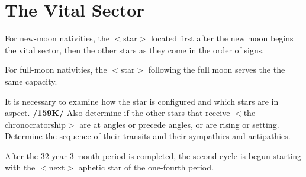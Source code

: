 \section{The Vital Sector}

For new-moon nativities, the $<$star$>$ located first after the new moon begins the vital sector, then the other stars as they come in the order of signs. 

For full-moon nativities, the $<$star$>$ following the full moon
serves the the same capacity. 

It is necessary to examine how the star is configured and which stars are in aspect. \textbf{/159K/} Also determine if the other stars that receive $<$the chronocratorship$>$ are at angles or precede angles, or are rising or setting. Determine the sequence of their transits and their sympathies and antipathies. 

After the 32 year 3 month period is completed, the second cycle is begun starting with the $<$next$>$ aphetic star of the one-fourth period.

\newpage
